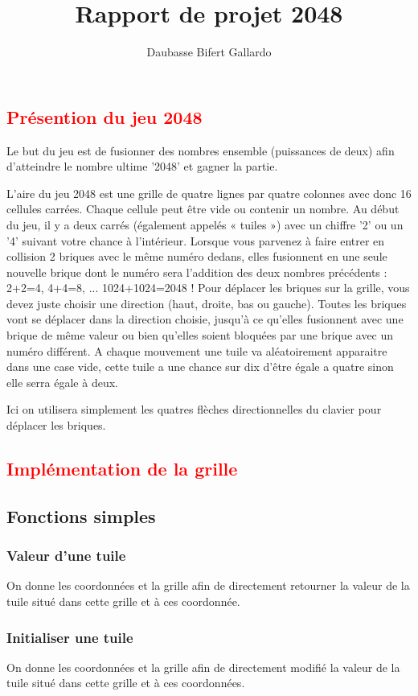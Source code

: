 \documentclass{article}
\title{Rapport de projet 2048}
\author{Daubasse Bifert Gallardo}
\begin{document}
\maketitle
\tableofcontents
\textcolor{red}{\section{Présention du jeu 2048}}
Le but du jeu est de fusionner des nombres ensemble (puissances de deux) afin d'atteindre le nombre ultime '2048' et gagner la partie.

L'aire du jeu 2048 est une grille de quatre lignes par quatre colonnes avec donc 16 cellules carrées. Chaque cellule peut être vide ou contenir un nombre. Au début du jeu, il y a deux carrés (également appelés « tuiles ») avec un chiffre '2' ou un '4' suivant votre chance à l'intérieur.
Lorsque vous parvenez à faire entrer en collision 2 briques avec le même numéro dedans, elles fusionnent en une seule nouvelle brique dont le numéro sera l'addition des deux nombres précédents : 2+2=4, 4+4=8, ... 1024+1024=2048 !
Pour déplacer les briques sur la grille, vous devez juste choisir une direction (haut, droite, bas ou gauche). Toutes les briques vont se déplacer dans la direction choisie, jusqu'à ce qu'elles fusionnent avec une brique de même valeur ou bien qu'elles soient bloquées par une brique avec un numéro différent. A chaque mouvement une tuile va aléatoirement apparaitre dans une case vide, cette tuile a une chance sur dix d'être égale a quatre sinon elle serra égale à deux.

Ici on utilisera simplement les quatres flèches directionnelles du clavier pour déplacer les briques.
\textcolor{red}{\section{Implémentation de la grille}}
\subsection{Fonctions simples}
\subsubsection{Valeur d'une tuile}
On donne les coordonnées et la grille afin de directement retourner la valeur de la tuile situé dans cette grille et à ces coordonnée.
\subsubsection{Initialiser une tuile}
On donne les coordonnées et la grille afin de directement modifié la valeur de la tuile situé dans cette grille et à ces coordonnées.
\end{document}
